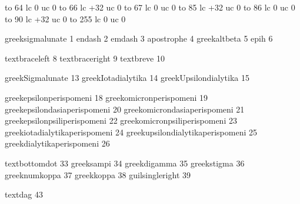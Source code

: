 
\startmapping[agr]

     to  64 lc   0 uc 0
     to  66 lc +32 uc 0
     to  67 lc   0 uc 0
     to  85 lc +32 uc 0
     to  86 lc   0 uc 0
     to  90 lc +32 uc 0
     to 255 lc   0 uc 0

\stopmapping

\startencoding[agr]

 greeksigmalunate                    1
 endash                              2
 emdash                              3
 apostrophe                          4
 greekaltbeta                        5
 epih                                6

 textbraceleft                       8
 textbraceright                      9
 textbreve                          10

 greekSigmalunate                   13
 greekIotadialytika                 14
 greekUpsilondialytika              15

 greekepsilonperispomeni            18
 greekomicronperispomeni            19
 greekepsilondasiaperispomeni       20
 greekomicrondasiaperispomeni       21
 greekepsilonpsiliperispomeni       22
 greekomicronpsiliperispomeni       23
 greekiotadialytikaperispomeni      24
 greekupsilondialytikaperispomeni   25
 greekdialytikaperispomeni          26

 textbottomdot                      33
 greeksampi                         34
 greekdigamma                       35
 greekstigma                        36
 greeknumkoppa                      37
 greekkoppa                         38
 guilsingleright                    39

 textdag                            43

